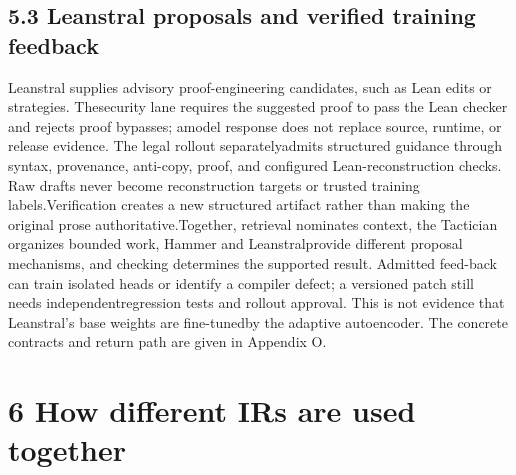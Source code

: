 \subsection*{5.3  Leanstral proposals and verified training feedback}
\noindent
Leanstral supplies advisory proof-engineering candidates, such as Lean edits or strategies. The\linebreak[4]
security lane requires the suggested proof to pass the Lean checker and rejects proof bypasses; a\linebreak[4]
model response does not replace source, runtime, or release evidence. The legal rollout separately\linebreak[4]
admits structured guidance through syntax, provenance, anti-copy, proof, and configured Lean-\linebreak[4]
reconstruction checks. Raw drafts never become reconstruction targets or trusted training labels.\linebreak[4]
Verification creates a new structured artifact rather than making the original prose authoritative.\linebreak[4]
[artifact S39,S40]\linebreak[4]
Together, retrieval nominates context, the Tactician organizes bounded work, Hammer and Leanstral\linebreak[4]
provide different proposal mechanisms, and checking determines the supported result. Admitted feed-\linebreak[4]
back can train isolated heads or identify a compiler defect; a versioned patch still needs independent\linebreak[4]
regression tests and rollout approval. This is not evidence that Leanstral's base weights are fine-tuned\linebreak[4]
by the adaptive autoencoder. The concrete contracts and return path are given in Appendix O.\par

\section*{6  How different IRs are used together}
